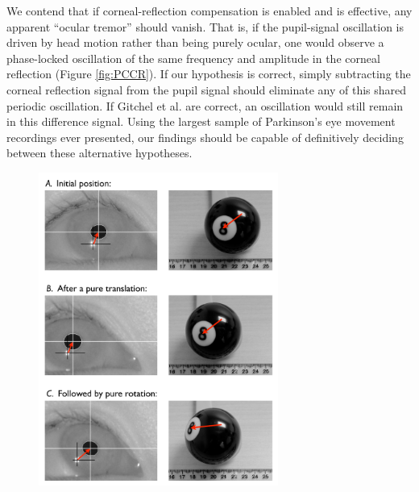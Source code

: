 \documentclass[jou,a4paper]{apa6}
\begin{document}
We contend that if corneal-reflection compensation is enabled and is effective, any apparent ``ocular tremor'' should vanish. That is, if the pupil-signal oscillation is driven by head motion rather than being purely ocular, one would observe a phase-locked oscillation of the same frequency and amplitude in the corneal reflection (Figure \ref{fig:PCCR}). If our hypothesis is correct, simply subtracting the corneal reflection signal from the pupil signal should eliminate any of this shared periodic oscillation. If Gitchel et al. are correct, an oscillation would still remain in this difference signal. Using the largest sample of Parkinson's eye movement recordings ever presented, our findings should be capable of definitively deciding between these alternative hypotheses.


\begin{figure}[htbp]
\begin{center}
\includegraphics [width=0.70\textwidth]{Figures/Figure_1_Explanatory}

\end{center}
\end{figure}
\end{document}
